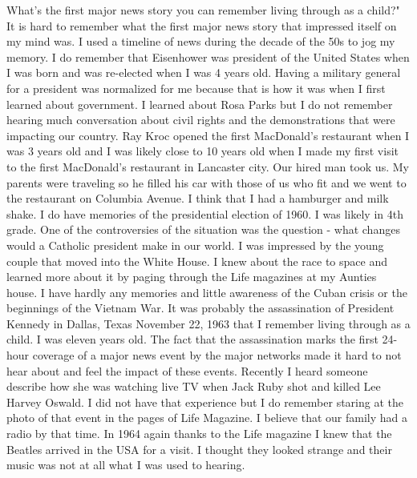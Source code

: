 What's the first major news story you can remember living through as a child?"
It is hard to remember what the first major news story that impressed itself on my mind was. I used a timeline of news during the decade of the 50s to jog my memory.
I do remember that Eisenhower was president of the United States when I was born and was re-elected when I was 4 years old. Having a military general for a president was normalized for me because that is how it was when I first learned about government. 
I learned about Rosa Parks but I do not remember hearing much conversation about civil rights and the demonstrations that were impacting our country.
Ray Kroc opened the first MacDonald's restaurant when I was 3 years old and I was likely close to 10 years old when I made my first visit to the first MacDonald's restaurant in Lancaster city. Our hired man took us. My parents were traveling so he filled his car with those of us who fit and we went to the restaurant on Columbia Avenue. I think that I had a hamburger and milk shake.
I do have memories of the presidential election of 1960. I was likely in 4th grade. One of the controversies of the situation was the question - what changes would a Catholic president make in our world. I was impressed by the young couple that moved into the White House.
I knew about the race to space and learned more about it by paging through the Life magazines at my Aunties house. 
I have hardly any memories and little awareness of the Cuban crisis or the beginnings of the Vietnam War.
It was probably the assassination of President Kennedy in Dallas, Texas November 22, 1963 that I remember living through as a child. I was eleven years old. The fact that the assassination marks the first 24-hour coverage of a major news event by the major networks made it hard to not hear about and feel the impact of these events. Recently I heard someone describe how she was watching live TV when Jack Ruby shot and killed Lee Harvey Oswald. I did not have that experience but I do remember staring at the photo of that event in the pages of Life Magazine. I believe that our family had a radio by that time.
In 1964 again thanks to the Life magazine I knew that the Beatles arrived in the USA for a visit. I thought they looked strange and their music was not at all what I was used to hearing.





